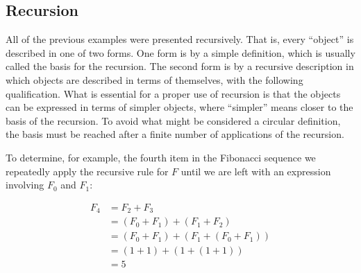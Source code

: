 \documentclass[10pt,]{book}
\theoremstyle{plain}
\theoremstyle{definition}
\theoremstyle{definition}
\theoremstyle{definition}
\theoremstyle{definition}
\numberwithin{equation}{section}
\begin{document}
\subsection[Recursion]{Recursion}\label{ss-recursion}
All of the previous examples were presented recursively. That is, every ``object'' is described in one of two forms. One form is by a simple
definition, which is usually called the basis for the recursion. The second form is by a recursive description in which objects are described in
terms of themselves, with the following qualification. What is essential for a proper use of recursion is that the objects can be
expressed in terms of simpler objects, where ``simpler'' means closer to the basis of the recursion. To avoid what might be considered a circular
definition, the basis must be reached after a finite number of applications of the recursion.%
\par
To determine, for example, the fourth item in the Fibonacci sequence we repeatedly apply the recursive rule for \(F\) until we are left
with an expression involving \(F_0\) and \(F_1\):

\begin{equation*}
\begin{split}
F_4 &= F_2+F_3\\	
	&=\left(F_0+F_1\right)+\left(F_1+F_2\right)\\
	&=\left(F_0+F_1\right)+\left(F_1+\left(F_0+F_1\right)\right)\\
	&=(1+1)+(1+(1+1))\\
	&=5
\end{split}
\end{equation*}
%
\typeout{************************************************}
\typeout{************************************************}
\end{document}
